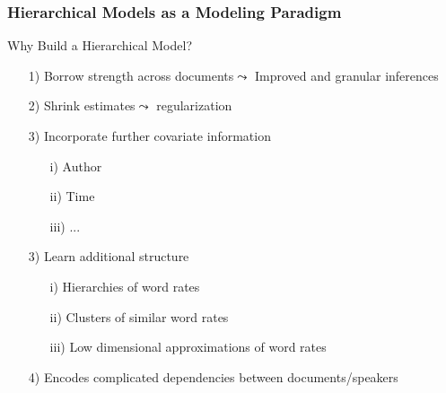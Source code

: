 \documentclass{beamer}
\numberwithin{equation}{section}
\begin{document}
\begin{frame}
\frametitle{Hierarchical Models as a Modeling Paradigm}


Why Build a Hierarchical Model?

\begin{itemize}
\item[1)] Borrow strength across documents$\leadsto$ Improved and granular inferences
\item[2)] Shrink estimates$\leadsto$ regularization
\item[3)] Incorporate further covariate information
\begin{itemize}
\item[i)] Author
\item[ii)] Time
\item[iii)] ...
\end{itemize}
\item[3)] Learn additional structure 
\begin{itemize}
\item[i)] Hierarchies of word rates
\item[ii)] Clusters of similar word rates
\item[iii)] Low dimensional approximations of word rates
\end{itemize}
\item[4)] Encodes complicated dependencies between documents/speakers

\end{itemize}



\end{frame}
\end{document}
